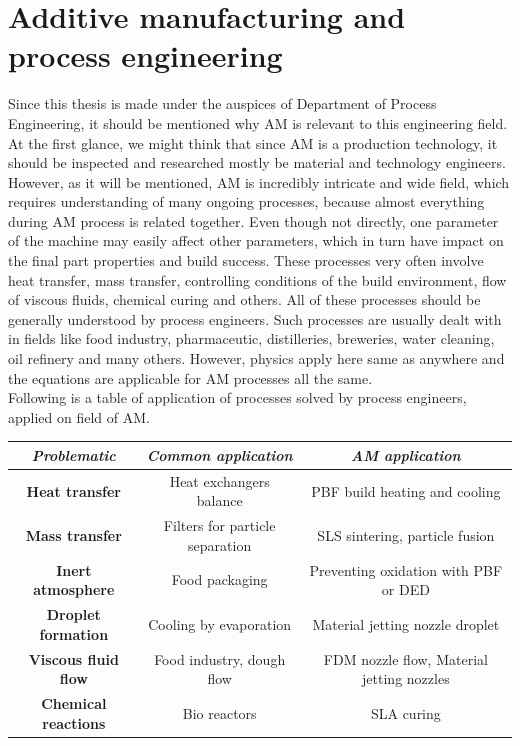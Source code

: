 \documentclass[a4paper, twoside, 11pt]{report}
\begin{document}
\section{Additive manufacturing and process engineering}
Since this thesis is made under the auspices of Department of Process Engineering, it should be mentioned why AM is relevant to this engineering field. At the first glance, we might think that since AM is a production technology, it should be inspected and researched mostly be material and technology engineers. However, as it will be mentioned, AM is incredibly intricate and wide field, which requires understanding of many ongoing processes, because almost everything during AM process is related together. Even though not directly, one parameter of the machine may easily affect other parameters, which in turn have impact on the final part properties and build success. These processes very often involve heat transfer, mass transfer, controlling conditions of the build environment, flow of viscous fluids, chemical curing and others. All of these processes should be generally understood by process engineers. Such processes are usually dealt with in fields like food industry, pharmaceutic, distilleries, breweries, water cleaning, oil refinery and many others. However, physics apply here same as anywhere and the equations are applicable for AM processes all the same.\\
Following is a table of application of processes solved by process engineers, applied on field of AM.
\\[10pt]
\begin{tabular}{||c||c||c|}
\hline 
\textit{Problematic} & \textit{Common application} & \textit{AM application} \\ 
\hline 
\textbf{Heat transfer} & Heat exchangers balance & PBF build heating and cooling \\
\hline
\textbf{Mass transfer} & Filters for particle separation & SLS sintering, particle fusion \\ 
\hline 
\textbf{Inert atmosphere} & Food packaging & Preventing oxidation with PBF or DED\\
\hline 
\textbf{Droplet formation} & Cooling by evaporation & Material jetting nozzle droplet \\ 
\hline 
\textbf{Viscous fluid flow} & Food industry, dough flow & FDM nozzle flow, Material jetting nozzles\\ 
\hline 
\textbf{Chemical reactions} & Bio reactors & SLA curing\\ 
\hline 
\end{tabular} 
%
\end{document}
